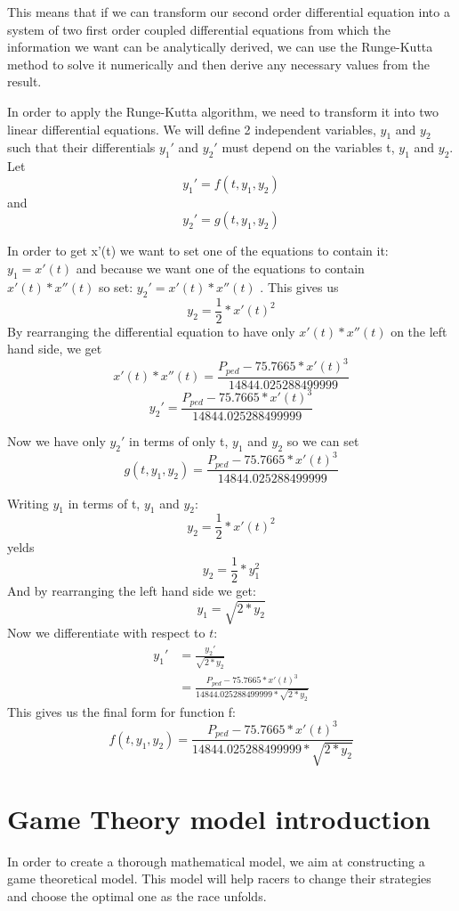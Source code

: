 \documentclass[10pt, a4paper]{report}
\begin{document}
This means that if we can transform our second order differential equation into a system of two first order coupled differential equations from which the information we want can be analytically derived, we can use the Runge-Kutta method to solve it numerically and then derive any necessary values from the result. \newline \par

In order to apply the Runge-Kutta algorithm, we need to transform it into two linear differential equations. We will define 2 independent variables, $y_1$ and $y_2$ such that their differentials $y_1'$ and $y_2'$ must depend on the variables t, $y_1$ and $y_2$. Let
$$ y_1' = f( t, y_1, y_2 )$$ and $$y_2' = g( t, y_1, y_2 )$$

In order to get x'(t) we want to set one of the equations to contain it: $y_1 = x'(t)$ and because we want one of the equations to contain $x'(t) * x''(t) $ so set: $y_2' = x'( t ) * x''( t )$ .
This gives us $$ y_{2} = \frac{1}{2} * x'(t)^2 $$
By rearranging the differential equation to have only $ x'( t ) * x''( t )$ on the left hand side, we get
$$ x'( t ) * x''( t ) = \frac{P_{ped} - 75.7665 * x'( t ) ^ 3}{14844.025288499999}$$
$$ y_2' = \frac{P_{ped} - 75.7665 * x'( t ) ^ 3}{14844.025288499999}$$

Now we have only $y_2'$ in terms of only t, $y_1$ and $y_2$ so we can set $$ g( t, y_1, y_2 ) = \frac{P_{ped} - 75.7665 * x'( t ) ^ 3}{14844.025288499999}$$

Writing $y_1$ in terms of t, $y_1$ and $y_2$: $$y_2 = \frac{1}{2} * x'(t)^2$$ yelds $$y_2 = \frac{1}{2} * y_1^2$$
And by rearranging the left hand side we get:
$$y_1 = \sqrt{2 * y_2}$$
Now we differentiate with respect to $t$:
\begin{align*}
y_1' & = \frac{y_2'}{\sqrt{2 * y_2}}\\
& = \frac{P_{ped} - 75.7665 * x'( t ) ^ 3}{14844.025288499999 * \sqrt{2 * y_2}}
\end{align*}
This gives us the final form for function f:
$$ f(t, y_1, y_2) = \frac{P_{ped} - 75.7665 * x'( t ) ^ 3}{14844.025288499999 * \sqrt{2 * y_2}}$$


\section{Game Theory model introduction}

In order to create a thorough mathematical model, we aim at constructing a game theoretical model. This model will help racers to change their strategies and choose the optimal one as the race unfolds.\\
\end{document}
